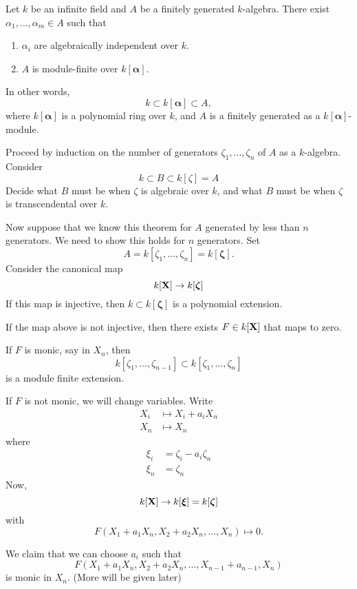 \documentclass{ximera}
\begin{document}
\begin{theorem}
  Let $k$ be an infinite field and $A$ be a finitely generated
  $k$-algebra. There exist $\alpha_1,\dots,\alpha_m\in A$ such that
  \begin{enumerate}
  \item $\alpha_i$ are algebraically independent over $k$.
  \item $A$ is module-finite over $k[\boldsymbol{\alpha}]$.
  \end{enumerate}
  In other words, 
  \[
  k\subset k[\boldsymbol{\alpha}] \subset A,
  \]
  where $k[\boldsymbol{\alpha}]$ is a polynomial ring over $k$, and
  $A$ is a finitely generated as a $k[\boldsymbol{\alpha}]$-module.
  \begin{sketch}
    Proceed by induction on the number of generators
    $\zeta_1,\dots,\zeta_n$ of $A$ as a $k$-algebra. Consider
    \[
    k \subset B \subset k[\zeta] = A
    \]
    Decide what $B$ must be when $\zeta$ is algebraic over $k$, and
    what $B$ must be when $\zeta$ is transcendental over $k$.

    Now suppose that we know this theorem for $A$ generated by less
    than $n$ generators. We need to show this holds for $n$
    generators. Set
    \[
    A = k[\zeta_1,\dots,\zeta_n] = k[\boldsymbol{\zeta}].
    \]
    Consider the canonical map
    \[
    k[\mathbf X] \to k[\boldsymbol{\zeta}]
    \]
    If this map is injective, then $k\subset k[\boldsymbol{\zeta}]$ is
    a polynomial extension.

    If the map above is not injective, then there exists $F\in k[\mathbf X]$
    that maps to zero.


    If $F$ is monic, say in $X_n$, then
    \[
    k[\zeta_1,\dots,\zeta_{n-1}] \subset k[\zeta_1,\dots,\zeta_n]
    \]
    is a module finite extension.


    If $F$ is not monic, we will change variables. Write
    \begin{align*}
      X_i &\mapsto X_i + a_i X_n\\
      X_n &\mapsto X_n
    \end{align*}
    where
    \begin{align*}
      \xi_i &= \zeta_i - a_i \zeta_n\\
      \xi_n &= \zeta_n
    \end{align*}
    Now,
    \[
    k[\mathbf X] \to k[\boldsymbol{\xi}]  = k[\boldsymbol{\zeta}]
    \]
    with
    \[
    F(X_1 + a_1 X_n,X_2 + a_2 X_n,\dots , X_n) \mapsto 0.
    \]

    We claim that we can choose $a_i$ such that
    \[
    F(X_1 + a_1 X_n,X_2 + a_2 X_n,\dots , X_{n-1} + a_{n-1},X_n)
    \]
    is monic in $X_n$.
    (More will be given later)
  \end{sketch}
\end{theorem}
\end{document}
